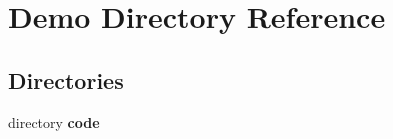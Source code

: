 \section{Demo Directory Reference}
\label{dir_90eccd53bca485b0a96715fbd28ee3f4}
\subsection*{Directories}
\begin{DoxyCompactItemize}
\item 
directory \textbf{ code}
\end{DoxyCompactItemize}
